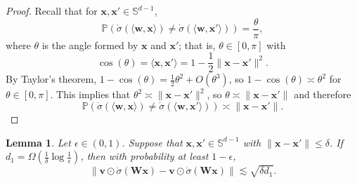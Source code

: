 \documentclass{article}
\newtheorem{lemma}[theorem]{Lemma}
\theoremstyle{definition}
\renewcommand{\P}{\mathbb{P}}
\renewcommand{\S}{\mathbb{S}}
\def\vv{{\bm{v}}}
\def\vw{{\bm{w}}}
\def\vx{{\bm{x}}}
\def\mW{{\bm{W}}}
\begin{document}
\begin{proof}
    Recall that for $\vx, \vx' \in \S^{d - 1}$,
    \[\P(\dot{\sigma}(\langle \vw, \vx \rangle) \neq \dot{\sigma}(\langle \vw, \vx' \rangle)) =  \frac{\theta}{\pi} , \]
    where $\theta$ is the angle formed by $\vx$ and $\vx'$; that is, $\theta \in [0, \pi]$ with \[\cos(\theta) = \langle \vx, \vx' \rangle = 1 - \frac{1}{2}\|\vx - \vx'\|^2. \]
    By Taylor's theorem, $1 - \cos(\theta) = \frac{1}{2}\theta^2 + O(\theta^3)$, so $1 - \cos(\theta) \asymp \theta^2$ for $\theta \in [0, \pi]$. This implies that $\theta^2 \asymp \|\vx - \vx'\|^2$, so $\theta \asymp \|\vx - \vx'\|$ and therefore
    \[\P(\dot{\sigma}(\langle \vw, \vx \rangle) \neq \dot{\sigma}(\langle \vw, \vx' \rangle)) \asymp \|\vx - \vx'\|. \]
\end{proof}

\begin{lemma}\label{lemma:activation-pattern-lipschitz}
    Let $\epsilon \in (0, 1)$. Suppose that $\vx, \vx' \in \S^{d - 1}$ with $\|\vx - \vx'\| \leq \delta$. If $d_1 = \Omega\left(\frac{1}{\delta}\log \frac{1}{\epsilon}\right)$, then with probability at least $1 - \epsilon$,
    \[\|\vv \odot \dot{\sigma}(\mW \vx) - \vv \odot \dot{\sigma}(\mW \vx)\| \lesssim \sqrt{\delta d_1}.\]
\end{lemma}
\end{document}
